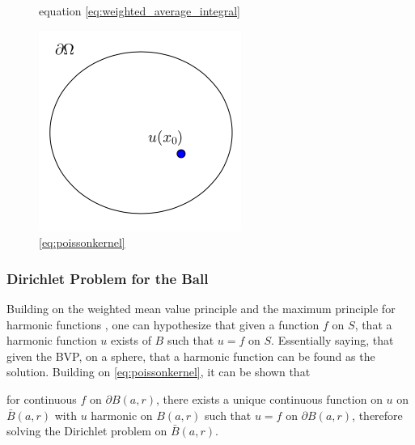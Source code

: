 \begin{figure}[!htb]
  \label{fig:generaloffset}
  \caption{equation \ref{eq:weighted_average_integral}}
\endminipage\hfill
{}%
  \vspace{4.5mm}
  \includegraphics[width=\linewidth]{styles/CircOffset}
  \caption{\ref{eq:poissonkernel}}\label{fig:circoffset}
\endminipage
\end{figure}
  \subsubsection{Dirichlet Problem for the Ball}
  Building on the weighted mean value principle and the maximum principle for harmonic functions
  , one can hypothesize that given a function $f$ on $S$, that a harmonic function $u$
  exists of $B$ such that $u = f$ on $S$. Essentially saying, that given the \gls{BVP},
  on a sphere, that a harmonic function can be found as the solution.  Building on
  \ref{eq:poissonkernel}, it can be shown that
\begin{theorem}
  for continuous $f$ on  $\partial B(a,r)$,
there exists a unique continuous function on $u$ on $\bar{B}(a,r)$ with $u$ harmonic on
$B(a,r)$ such that $ u = f $ on
$\partial B(a,r)$, therefore solving the Dirichlet problem on $\bar{B}(a,r)$\cite{Axler1992}.
\end{theorem}

